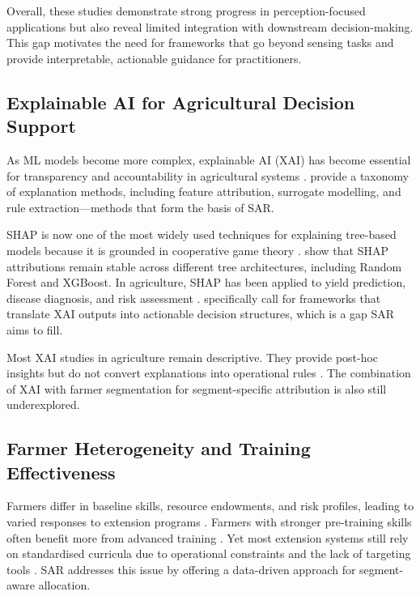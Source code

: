 \documentclass[3p,twocolumn,authoryear]{elsarticle}
\begin{document}
Overall, these studies demonstrate strong progress in perception-focused
applications but also reveal limited integration with downstream decision-making.
This gap motivates the need for frameworks that go beyond sensing tasks and
provide interpretable, actionable guidance for practitioners.

\subsection{Explainable AI for Agricultural Decision Support}

As ML models become more complex, explainable AI (XAI) has become essential for
transparency and accountability in agricultural systems
\citep{arrieta2020,linardatos2021}. \citet{guidotti2019} provide a taxonomy of
explanation methods, including feature attribution, surrogate modelling, and
rule extraction—methods that form the basis of SAR.

SHAP is now one of the most widely used techniques for explaining tree-based
models because it is grounded in cooperative game theory \citep{lundberg2017}.
\citet{lundberg2020} show that SHAP attributions remain stable across different
tree architectures, including Random Forest and XGBoost. In agriculture, SHAP
has been applied to yield prediction, disease diagnosis, and risk assessment
\citep{ghosal2018,ryo2022}. \citet{ryo2022} specifically call for frameworks
that translate XAI outputs into actionable decision structures, which is a gap
SAR aims to fill.

Most XAI studies in agriculture remain descriptive. They provide post-hoc
insights but do not convert explanations into operational rules
\citep{linardatos2021,arrieta2020}. The combination of XAI with farmer
segmentation for segment-specific attribution is also still underexplored.

\subsection{Farmer Heterogeneity and Training Effectiveness}

Farmers differ in baseline skills, resource endowments, and risk profiles,
leading to varied responses to extension programs \citep{feder1985,anderson2004}.
Farmers with stronger pre-training skills often benefit more from advanced
training \citep{davis2012}. Yet most extension systems still rely on
standardised curricula due to operational constraints and the lack of targeting
tools \citep{anderson2004}. SAR addresses this issue by offering a data-driven
approach for segment-aware allocation.
\end{document}
